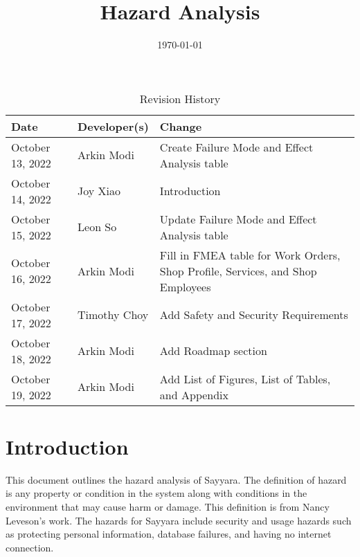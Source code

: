 \documentclass{article}
\title{Hazard Analysis\\\progname}
\author{\authname}
\date{\today}
\begin{document}
\maketitle
\thispagestyle{empty}

\newpage


\begin{table}[hp]
	\caption{Revision History} \label{TblRevisionHistory}
	\begin{tabularx}{\textwidth}{llX}
		\toprule
		\textbf{Date}    & \textbf{Developer(s)} & \textbf{Change}                                                                \\
		\midrule
		October 13, 2022 & Arkin Modi            & Create Failure Mode and Effect Analysis table                                  \\
		October 14, 2022 & Joy Xiao              & Introduction                                                                   \\
		October 15, 2022 & Leon So               & Update Failure Mode and Effect Analysis table                                  \\
		October 16, 2022 & Arkin Modi            & Fill in FMEA table for Work Orders, Shop Profile, Services, and Shop Employees \\
		October 17, 2022 & Timothy Choy          & Add Safety and Security Requirements                                           \\
		October 18, 2022 & Arkin Modi            & Add Roadmap section                                                            \\
		October 19, 2022 & Arkin Modi            & Add List of Figures, List of Tables, and Appendix                              \\
		\bottomrule
	\end{tabularx}
\end{table}

\newpage

\tableofcontents

\newpage

\listoftables

\listoffigures

\newpage


\section{Introduction}
This document outlines the hazard analysis of Sayyara. The definition of hazard is any property or
condition in the system along with conditions in the environment that may cause harm or damage.
This definition is from Nancy Leveson's work. The hazards for Sayyara include security and usage
hazards such as protecting personal information, database failures, and having no internet
connection.
\end{document}
